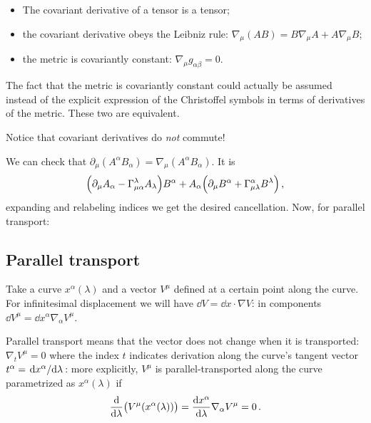 \documentclass[main.tex]{subfiles}
\begin{document}
\begin{itemize}
    \item The covariant derivative of a tensor is a tensor;
    \item the covariant derivative obeys the Leibniz rule: \(\nabla_{\mu} (AB) = B \nabla_{\mu }A + A \nabla_{\mu }B\);
    \item the metric is covariantly constant: \(\nabla_{\mu }g_{\alpha \beta }=0\). 
\end{itemize}

The fact that the metric is covariantly constant could actually be assumed instead of the explicit expression of the Christoffel symbols in terms of derivatives of the metric. These two are equivalent.

Notice that covariant derivatives do \emph{not} commute!

We can check that \(\partial_{\mu} (A^{\alpha }B_{\alpha }) = \nabla_{\mu } (A^{\alpha }B_{\alpha })\). It is 
%
\begin{equation}
  \qty(\partial_{\mu }A_{\alpha } - \Gamma^{\lambda }_{\mu \alpha }A_{\lambda })B^{\alpha } 
  + A_{\alpha }\qty(\partial_{\mu }B^{\alpha } + \Gamma_{\mu \lambda }^{ \alpha }B^{\lambda })
\,,
\end{equation}
%
expanding and relabeling indices we get the desired cancellation. Now, for parallel transport:

\subsection{Parallel transport}

Take a curve \(x^{\alpha }(\lambda )\) and a vector \(V^{\mu }\) defined at a certain point along the curve.
For infinitesimal displacement we will have \(\dd{V} = \dd{x} \cdot \nabla V\): in components \(\dd{V^{\mu }} = \dd{x^{\alpha }} \nabla_{\alpha }V^{\mu }\).

Parallel transport means that the vector does not change when it is transported: \(\nabla_t V^{\mu }=0\) where the index \(t \) indicates derivation along the curve's tangent vector \(t^{\alpha }= \dv*{x^{\alpha }}{\lambda } \): more explicitly, \(V^{\mu }\) is parallel-transported along the curve parametrized as \(x^{\alpha }(\lambda )\) if 
%
\begin{align}
\dv{}{\lambda } \qty(V^{\mu }(x^{\alpha }(\lambda )))
=
\dv{x^{\alpha }}{\lambda } \nabla_{\alpha } V^{\mu } 
= 0
\,.
\end{align}
\end{document}
